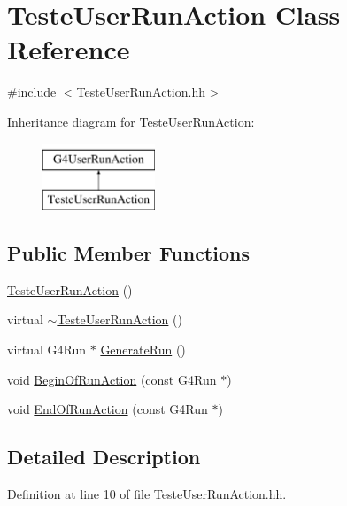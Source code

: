 \hypertarget{class_teste_user_run_action}{\section{Teste\-User\-Run\-Action Class Reference}
\label{class_teste_user_run_action}
}


{\ttfamily \#include $<$Teste\-User\-Run\-Action.\-hh$>$}

Inheritance diagram for Teste\-User\-Run\-Action\-:\begin{figure}[H]
\begin{center}
\leavevmode
\includegraphics[height=2.000000cm]{class_teste_user_run_action}
\end{center}
\end{figure}
\subsection*{Public Member Functions}
\begin{DoxyCompactItemize}
\item 
\hyperlink{class_teste_user_run_action_a8bde0729eae5ed2ac0030c9d228a7d3d}{Teste\-User\-Run\-Action} ()
\item 
virtual \hyperlink{class_teste_user_run_action_aa09b2e6b369b9b4b073be3ab6cca9d4f}{$\sim$\-Teste\-User\-Run\-Action} ()
\item 
virtual G4\-Run $\ast$ \hyperlink{class_teste_user_run_action_a3a086b2408880a12e757e1381bb5d846}{Generate\-Run} ()
\item 
void \hyperlink{class_teste_user_run_action_abb8bb1bf72adf9b880b680565484582d}{Begin\-Of\-Run\-Action} (const G4\-Run $\ast$)
\item 
void \hyperlink{class_teste_user_run_action_ad638f0a994d5ea37eaa371378d59b522}{End\-Of\-Run\-Action} (const G4\-Run $\ast$)
\end{DoxyCompactItemize}


\subsection{Detailed Description}


Definition at line 10 of file Teste\-User\-Run\-Action.\-hh.



